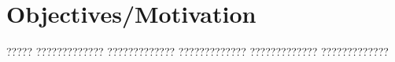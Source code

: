 \chapter{Objectives/Motivation}

????? ????????????? ????????????? ????????????? ????????????? ?????????????